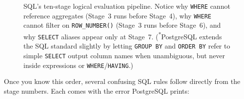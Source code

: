 \begin{figure}[htbp]
\caption{SQL's ten-stage logical evaluation pipeline. Notice why \texttt{WHERE} cannot reference aggregates (Stage~3 runs before Stage~4), why \texttt{WHERE} cannot filter on \texttt{ROW\_NUMBER()} (Stage~3 runs before Stage~6), and why \texttt{SELECT} aliases appear only at Stage~7. (\textsuperscript{*}PostgreSQL extends the SQL standard slightly by letting \texttt{GROUP BY} and \texttt{ORDER BY} refer to simple \texttt{SELECT} output column names when unambiguous, but never inside expressions or \texttt{WHERE}/\texttt{HAVING}.)}
\label{ch01:fig-sql-pipeline}
\end{figure}

Once you know this order, several confusing SQL rules follow directly from the stage numbers. Each comes with the error PostgreSQL prints:

